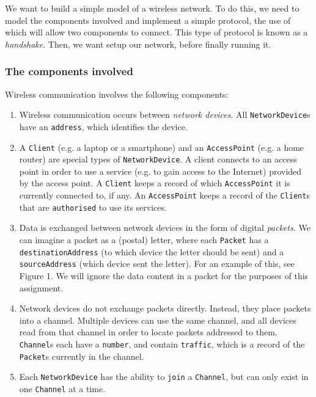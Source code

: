 \documentclass[11pt]{article}
\begin{document}
We want to build a simple model of a wireless network. To do this, we need to model the components involved and implement a simple protocol, the use of which will allow two components to connect. This type of protocol is known as a \emph{handshake}. Then, we want setup our network, before finally running it. 

\subsubsection{The components involved}

Wireless communication involves the following components: 
	
\begin{enumerate}
	
	\item Wireless communication occurs between \emph{network devices}. All \texttt{NetworkDevice}s have an \texttt{address}, which identifies the device.
	
	\item A \texttt{Client} (e.g. a laptop or a smartphone) and an \texttt{AccessPoint} (e.g. a home router) are special types of \texttt{NetworkDevice}. A client connects to an access point in order to use a service (e.g. to gain access to the Internet) provided by the access point.  A \texttt{Client} keeps a record of which \texttt{AccessPoint} it is currently connected to, if any. An \texttt{AccessPoint} keeps a record of the \texttt{Client}s that are \texttt{authorised} to use its services.
	
	\item Data is exchanged between network devices in the form of digital \emph{packets}. We can imagine a packet as a (postal) letter, where each \texttt{Packet} has a \texttt{destinationAddress} (to which device the letter should be sent) and a \texttt{sourceAddress} (which device sent the letter). For an example of this, see Figure 1. We will ignore the data content in a packet for the purposes of this assignment.
	
	\item  Network devices do not exchange packets directly. Instead, they place packets into a channel. Multiple devices can use the same channel, and all devices read from that channel in order to locate packets addressed to them. \texttt{Channel}s  each have a \texttt{number}, and contain \texttt{traffic}, which is a record of the \texttt{Packet}s currently in the channel. 
	
	\item Each \texttt{NetworkDevice} has the ability to \texttt{join} a \texttt{Channel}, but can only exist in one \texttt{Channel} at a time.
	

\end{enumerate}
\end{document}
